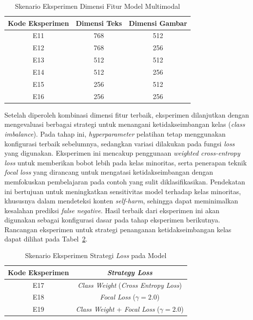 \begin{table}[H]
    \centering
    \caption{Skenario Eksperimen Dimensi Fitur Model Multimodal}
    \label{tabel:variasi_dimensi_fitur_multimodal}
    \small
    \setlength{\tabcolsep}{8pt}
    \renewcommand{\arraystretch}{1.1}
    \begin{tabular}{c c c}
        \hline
        \textbf{Kode Eksperimen} & \textbf{Dimensi Teks} & \textbf{Dimensi Gambar} \\
        \hline
        E11 & 768 & 512 \\
        E12 & 768 & 256 \\
        E13 & 512 & 512 \\
        E14 & 512 & 256 \\
        E15 & 256 & 512 \\
        E16 & 256 & 256 \\
        \hline
    \end{tabular}
\end{table}

Setelah diperoleh kombinasi dimensi fitur terbaik, eksperimen dilanjutkan dengan mengevaluasi berbagai strategi untuk menangani ketidakseimbangan kelas (\textit{class imbalance}). Pada tahap ini, \textit{hyperparameter} pelatihan tetap menggunakan konfigurasi terbaik sebelumnya, sedangkan variasi dilakukan pada fungsi \textit{loss} yang digunakan. Eksperimen ini mencakup penggunaan \textit{weighted cross-entropy loss} untuk memberikan bobot lebih pada kelas minoritas, serta penerapan teknik \textit{focal loss} yang dirancang untuk mengatasi ketidakseimbangan dengan memfokuskan pembelajaran pada contoh yang sulit diklasifikasikan. Pendekatan ini bertujuan untuk meningkatkan sensitivitas model terhadap kelas minoritas, khususnya dalam mendeteksi konten \textit{self-harm}, sehingga dapat meminimalkan kesalahan prediksi \textit{false negative}. Hasil terbaik dari eksperimen ini akan digunakan sebagai konfigurasi dasar pada tahap eksperimen berikutnya. Rancangan eksperimen untuk strategi penanganan ketidakseimbangan kelas dapat dilihat pada Tabel~\ref{tabel:strategi_penanganan_imbalance_multimodal}.

\begin{table}[H]
    \centering
    \caption{Skenario Eksperimen Strategi \textit{Loss} pada Model}
    \label{tabel:strategi_penanganan_imbalance_multimodal}
    \small
    \setlength{\tabcolsep}{8pt}
    \renewcommand{\arraystretch}{1.1}
    \begin{tabular}{c c}
        \hline
        \textbf{Kode Eksperimen} & \textbf{\textit{Strategy Loss}} \\
        \hline
        E17 & \textit{Class Weight} (\textit{Cross Entropy Loss}) \\
        E18 & \textit{Focal Loss} ($\gamma = 2.0$) \\
        E19 & \textit{Class Weight} + \textit{Focal Loss} ($\gamma = 2.0$) \\
        \hline
    \end{tabular}
\end{table}

